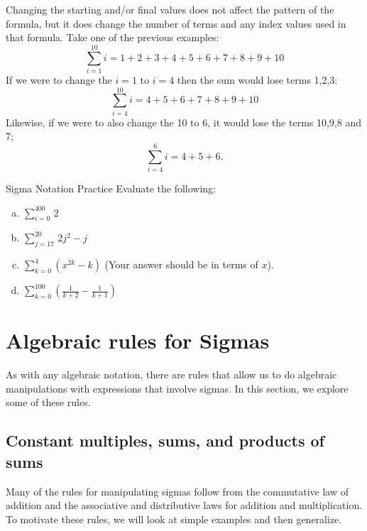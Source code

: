 Changing the starting and/or final values does not affect the pattern of the formula, but it does change the number of terms and any index values used in that formula.  Take one of the previous examples:
\[\sum _{i=1}^{10}i = 1 + 2 + 3 + 4 + 5 + 6 + 7 + 8 + 9 + 10\]
If we were to change the $i=1$ to $i=4$ then the sum would lose terms 1,2,3:
\[\sum _{i=4}^{10}i = 4 + 5 + 6 + 7 + 8 + 9 + 10\]
Likewise, if we were to also change the 10 to 6, it would lose the terms 10,9,8 and 7;
\[\sum _{i=4}^{6}i = 4 + 5 + 6.\]

\begin{exercise}{Sigma Notation Practice}
Evaluate the following:
\begin{enumerate}[(a)]
\item
$\displaystyle{\sum _{i=0}^{400} \,2}$
\item
$\displaystyle{ \sum_{j=17}^{20} \, 2j^2 - j}$
\item
$\displaystyle{ \sum_{k=0}^{4}(x^{2k} - k)}$  \quad (Your answer should be in terms of  $x$).
\item
$\displaystyle{ \sum_{k=0}^{100} \left(\frac{1}{k+2} - \frac{1}{k+1}\right)}$
\end {enumerate}
\end{exercise}

\section{Algebraic rules for Sigmas} \label{sec:sigmaProperties}

As with any algebraic notation, there are rules that allow us to do algebraic manipulations with expressions that involve sigmas. In this section, we explore some of these rules.

\subsection{Constant multiples, sums, and products of sums}

Many of the rules for manipulating sigmas follow from the commutative law of addition and the associative and distributive laws for addition and multiplication. To motivate these rules, we will look at simple examples and then generalize.

